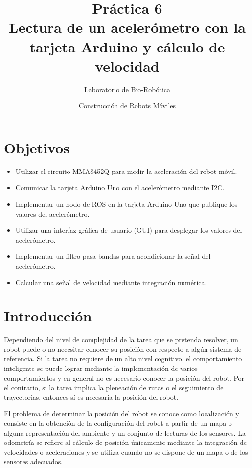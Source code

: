 \documentclass[a4paper,12pt]{article}
\title{Práctica 6 \\ Lectura de un acelerómetro con la tarjeta Arduino y cálculo de velocidad}
\author{Laboratorio de Bio-Robótica}
\date{Construcción de Robots Móviles}
\begin{document}
\renewcommand{\tablename}{Tabla}
\maketitle
\section*{Objetivos}
\begin{itemize}
\item Utilizar el circuito MMA8452Q para medir la aceleración del robot móvil. 
\item Comunicar la tarjeta Arduino Uno con el acelerómetro mediante I2C.
\item Implementar un nodo de ROS en la tarjeta Arduino Uno que publique los valores del acelerómetro. 
\item Utilizar una interfaz gráfica de usuario (GUI) para desplegar los valores del acelerómetro. 
\item Implementar un filtro pasa-bandas para acondicionar la señal del acelerómetro.
\item Calcular una señal de velocidad mediante integración numérica. 
\end{itemize}

\section{Introducción}
Dependiendo del nivel de complejidad de la tarea que se pretenda resolver, un robot puede o no necesitar conocer su posición con respecto a algún sistema de referencia. Si la tarea no requiere de un alto nivel cognitivo, el comportamiento inteligente se puede lograr mediante la implementación de varios comportamientos y en general no es necesario conocer la posición del robot. Por el contrario, si la tarea implica la pleneación de rutas o el seguimiento de trayectorias, entonces sí es necesaria la posición del robot. 

El problema de determinar la posición del robot se conoce como localización y consiste en la obtención de la configuración del robot a partir de un mapa o alguna representación del ambiente y un conjunto de lecturas de los sensores. La odometría se refiere al cálculo de posición únicamente mediante la integración de velocidades o aceleraciones y se utiliza cuando no se dispone de un mapa o de los sensores adecuados. 
\end{document}
